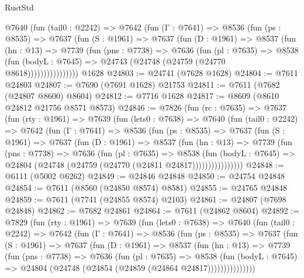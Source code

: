 \begin{lexlean}{RustStd}
\begin{coremodule}
{\begin{coremodule}
{{{{{{{{{{{{{{{{{{{{{{{{{{{{{{{{{{          @7640
            (fun (tail0 : @2242) =>
            @7642
              (fun (Γ : @7641) =>
              @8536
                (fun (ps : @8535) =>
                @7637
                  (fun (S : @1961) =>
                  @7637
                    (fun (D : @1961) =>
                    @8537
                      (fun (hn : @13) =>
                      @7739
                        (fun (pns : @7738) =>
                        @7636
                          (fun (pl : @7635) =>
                          @8538
                            (fun (bodyL : @7645) =>
                            @24743 (@24748 (@24759 (@24770 @8618))))))))))))))))
    @1628
@24803 := @24741 (@7628 @1628)
@24804 := @7611 @24803
@24807 := @7690 (@7691 @1628) @21753
@24811 := @7611 (@7682 (@24807 @8600) @8604)
@24812 := @7716 @1628
@24817 := @8609 (@8610 @24812 @21756 @8571 @8573)
@24846 := @7826
    (fun (rc : @7635) =>
    @7637
      (fun (rty : @1961) =>
      @7639
        (fun (lets0 : @7638) =>
        @7640
          (fun (tail0 : @2242) =>
          @7642
            (fun (Γ : @7641) =>
            @8536
              (fun (ps : @8535) =>
              @7637
                (fun (S : @1961) =>
                @7637
                  (fun (D : @1961) =>
                  @8537
                    (fun (hn : @13) =>
                    @7739
                      (fun (pns : @7738) =>
                      @7636
                        (fun (pl : @7635) =>
                        @8538
                          (fun (bodyL : @7645) =>
                          @24804 (@24748 (@24759 (@24770 (@24811 @24817))))))))))))))))
@24848 := @6111 (@5002 @6262)
@24849 := @24846 @24848
@24850 := @24754 @24848
@24854 := @7611 (@8560 (@24850 @8574) @8581)
@24855 := @24765 @24848
@24859 := @7611 (@7741 (@24855 @8574) @2103)
@24861 := @24807 (@7698 @24848)
@24862 := @7682 @24861
@24864 := @7611 (@24862 @8604)
@24892 := @7829
    (fun (rty : @1961) =>
    @7639
      (fun (lets0 : @7638) =>
      @7640
        (fun (tail0 : @2242) =>
        @7642
          (fun (Γ : @7641) =>
          @8536
            (fun (ps : @8535) =>
            @7637
              (fun (S : @1961) =>
              @7637
                (fun (D : @1961) =>
                @8537
                  (fun (hn : @13) =>
                  @7739
                    (fun (pns : @7738) =>
                    @7636
                      (fun (pl : @7635) =>
                      @8538
                        (fun (bodyL : @7645) =>
                        @24804 (@24748 (@24854 (@24859 (@24864 @24817)))))))))))))))
}}}}}}}}}}}}}}}}}}}}}}}}}}}}}}}}}}
\end{coremodule}}
\end{coremodule}
\end{lexlean}
